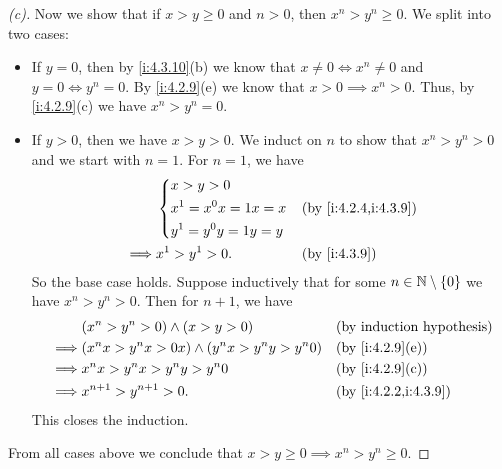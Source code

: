 \begin{proof}[(c)]
  Now we show that if \(x > y \geq 0\) and \(n > 0\), then \(x^n > y^n \geq 0\).
  We split into two cases:
  \begin{itemize}
    \item If \(y = 0\), then by \cref{i:4.3.10}(b) we know that \(x \neq 0 \iff x^n \neq 0\) and \(y = 0 \iff y^n = 0\).
          By \cref{i:4.2.9}(e) we know that \(x > 0 \implies x^n > 0\).
          Thus, by \cref{i:4.2.9}(c) we have \(x^n > y^n = 0\).
    \item If \(y > 0\), then we have \(x > y > 0\).
          We induct on \(n\) to show that \(x^n > y^n > 0\) and we start with \(n = 1\).
          For \(n = 1\), we have
          \begin{align*}
                     & \begin{dcases}
                         x > y > 0            \\
                         x^1 = x^0 x = 1x = x \\
                         y^1 = y^0 y = 1y = y
                       \end{dcases} &  & \by{i:4.2.4,i:4.3.9}    \\
            \implies & x^1 > y^1 > 0.          &  & \by{i:4.3.9}
          \end{align*}
          So the base case holds.
          Suppose inductively that for some \(n \in \mathbb{N} \setminus \left\lbrace0\right\rbrace\) we have \(x^n > y^n > 0\).
          Then for \(n + 1\), we have
          \begin{align*}
                     & (x^n > y^n > 0) \land (x > y > 0)                  &  & \byIH                \\
            \implies & (x^n x > y^n x > 0x) \land (y^n x > y^n y > y^n 0) &  & \by{i:4.2.9}[e]      \\
            \implies & x^n x > y^n x > y^n y > y^n 0                      &  & \by{i:4.2.9}[c]      \\
            \implies & x^{n + 1} > y^{n + 1} > 0.                         &  & \by{i:4.2.2,i:4.3.9}
          \end{align*}
          This closes the induction.
  \end{itemize}
  From all cases above we conclude that \(x > y \geq 0 \implies x^n > y^n \geq 0\).
\end{proof}

